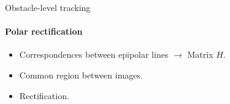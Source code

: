 \begin{frame}{Obstacle-level tracking}
  \framesubtitle{Polar rectification}
  \begin{itemize}
    \item<1-> Correspondences between epipolar lines $\rightarrow$ Matrix $H$.
    \item<2-> Common region between images.
    \item<3-> Rectification.
  \end{itemize}
  \begin{overlayarea}{\textwidth}{\textheight}
\end{overlayarea}
\end{frame}
